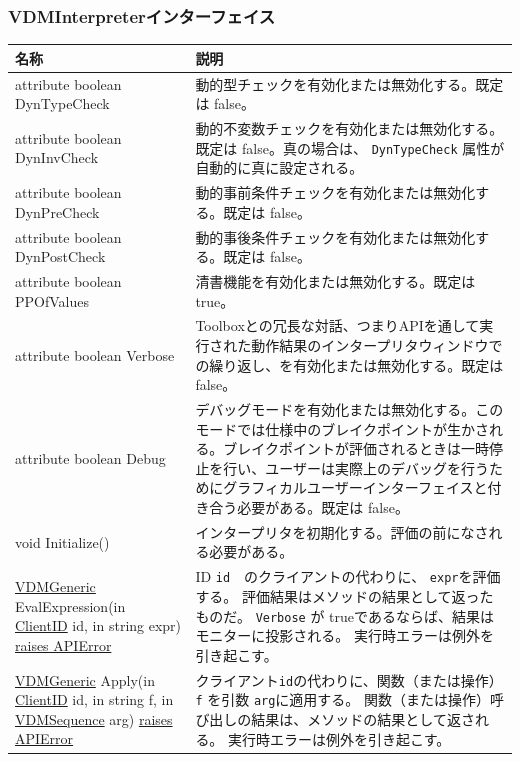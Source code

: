 \documentclass[\pformat,12pt]{jarticle}
\newcommand{\pbs}[1]{\let\temp=\\#1\let\\=\temp}
\newenvironment{interfacetable}{%
  \begin{longtable}{|>{\pbs\raggedright\ttfamily}p{6.6cm}%
                    |>{\pbs\raggedright}p{6.6cm}|} \hline
  \textrm{\bfseries 名称} &  \textbf{説明} \\ \hline
  \endhead
  }{\end{longtable}}
\newcommand{\APIError}{\hyperlink{exception.APIError}{raises APIError}}
\newcommand{\VDMGeneric}{\hyperlink{interface.Generic}{VDMGeneric}}
\newcommand{\ClientID}{\hyperlink{type.ClientID}{ClientID}}
\newcommand{\VDMSequence}{\hyperlink{interface.VDMSequence}{VDMSequence}}
\begin{document}
\subsubsection{VDMInterpreterインターフェイス}
\mbox{}
\begin{interfacetable}

attribute boolean DynTypeCheck
  & 動的型チェックを有効化または無効化する。既定は \textsf{false}。
\\ \hline
attribute boolean DynInvCheck
  & 動的不変数チェックを有効化または無効化する。既定は \textsf{false}。真の場合は、 \texttt{DynTypeCheck} 属性が自動的に真に設定される。
\\ \hline
attribute boolean DynPreCheck
  & 動的事前条件チェックを有効化または無効化する。既定は \textsf{false}。 
\\ \hline
attribute boolean DynPostCheck
  & 動的事後条件チェックを有効化または無効化する。既定は \textsf{false}。 
\\ \hline
attribute boolean PPOfValues
  & 清書機能を有効化または無効化する。既定は \textsf{true}。 
\\ \hline
attribute boolean Verbose
  & Toolboxとの冗長な対話、つまりAPIを通して実行された動作結果のインタープリタウィンドウでの繰り返し、を有効化または無効化する。既定は \textsf{false}。
\\ \hline
attribute boolean Debug
  & デバッグモードを有効化または無効化する。このモードでは仕様中のブレイクポイントが生かされる。ブレイクポイントが評価されるときは一時停止を行い、ユーザーは実際上のデバッグを行うためにグラフィカルユーザーインターフェイスと付き合う必要がある。既定は \textsf{false}。
\\ \hline
void Initialize() %
  & インタープリタを初期化する。評価の前になされる必要がある。
\\ \hline
{\VDMGeneric} EvalExpression(in {\ClientID} id, in string expr) \APIError
  & ID \texttt{id}　のクライアントの代わりに、 \texttt{expr}を評価する。
    評価結果はメソッドの結果として返ったものだ。 \texttt{Verbose} が
    \textsf{true}であるならば、結果はモニターに投影される。
    実行時エラーは例外を引き起こす。
\\ \hline
{\VDMGeneric} Apply(in {\ClientID} id, in string f, in {\VDMSequence} arg)
\APIError
  & クライアント\texttt{id}の代わりに、関数（または操作） \texttt{f} を引数 \texttt{arg}に適用する。 関数（または操作）呼び出しの結果は、メソッドの結果として返される。
    実行時エラーは例外を引き起こす。

\end{interfacetable}
\end{document}
